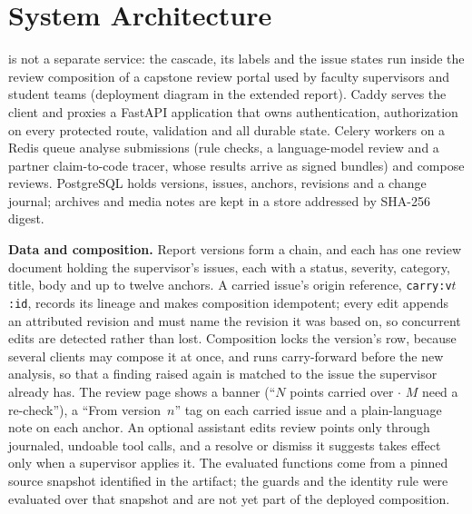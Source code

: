 \section{System Architecture}\label{sec:impl}

\sys{} is not a separate service: the cascade, its labels and the issue states run inside the review composition of a capstone review portal used by faculty supervisors and student teams (deployment diagram in the extended report). Caddy serves the client and proxies a FastAPI application that owns authentication, authorization on every protected route, validation and all durable state. Celery workers on a Redis queue analyse submissions (rule checks, a language-model review and a partner claim-to-code tracer, whose results arrive as signed bundles) and compose reviews. PostgreSQL holds versions, issues, anchors, revisions and a change journal; archives and media notes are kept in a store addressed by SHA-256 digest.

\textbf{Data and composition.} Report versions form a chain, and each has one review document holding the supervisor's issues, each with a status, severity, category, title, body and up to twelve anchors. A carried issue's origin reference, \texttt{carry:v$t$:id}, records its lineage and makes composition idempotent; every edit appends an attributed revision and must name the revision it was based on, so concurrent edits are detected rather than lost. Composition locks the version's row, because several clients may compose it at once, and runs carry-forward before the new analysis, so that a finding raised again is matched to the issue the supervisor already has. The review page shows a banner (``$N$ points carried over $\cdot$ $M$ need a re-check''), a ``From version~$n$'' tag on each carried issue and a plain-language note on each anchor. An optional assistant edits review points only through journaled, undoable tool calls, and a resolve or dismiss it suggests takes effect only when a supervisor applies it. The evaluated functions come from a pinned source snapshot identified in the artifact; the guards and the identity rule were evaluated over that snapshot and are not yet part of the deployed composition.

